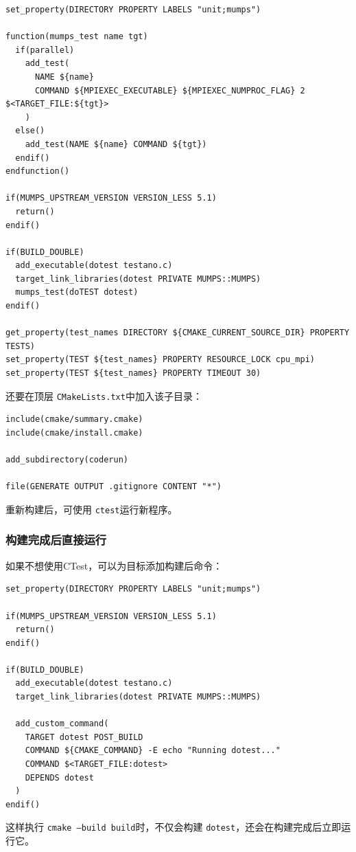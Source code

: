 \begin{lstlisting}
set_property(DIRECTORY PROPERTY LABELS "unit;mumps")

function(mumps_test name tgt)
  if(parallel)
    add_test(
      NAME ${name}
      COMMAND ${MPIEXEC_EXECUTABLE} ${MPIEXEC_NUMPROC_FLAG} 2 $<TARGET_FILE:${tgt}>
    )
  else()
    add_test(NAME ${name} COMMAND ${tgt})
  endif()
endfunction()

if(MUMPS_UPSTREAM_VERSION VERSION_LESS 5.1)
  return()
endif()

if(BUILD_DOUBLE)
  add_executable(dotest testano.c)
  target_link_libraries(dotest PRIVATE MUMPS::MUMPS)
  mumps_test(doTEST dotest)
endif()

get_property(test_names DIRECTORY ${CMAKE_CURRENT_SOURCE_DIR} PROPERTY TESTS)
set_property(TEST ${test_names} PROPERTY RESOURCE_LOCK cpu_mpi)
set_property(TEST ${test_names} PROPERTY TIMEOUT 30)
\end{lstlisting}

还要在顶层 \texttt{CMakeLists.txt}中加入该子目录：

\begin{lstlisting}
include(cmake/summary.cmake)
include(cmake/install.cmake)

add_subdirectory(coderun)

file(GENERATE OUTPUT .gitignore CONTENT "*")
\end{lstlisting}

重新构建后，可使用 \texttt{ctest}运行新程序。

\subsubsection{构建完成后直接运行}

如果不想使用CTest，可以为目标添加构建后命令：

\begin{lstlisting}
set_property(DIRECTORY PROPERTY LABELS "unit;mumps")

if(MUMPS_UPSTREAM_VERSION VERSION_LESS 5.1)
  return()
endif()

if(BUILD_DOUBLE)
  add_executable(dotest testano.c)
  target_link_libraries(dotest PRIVATE MUMPS::MUMPS)

  add_custom_command(
    TARGET dotest POST_BUILD
    COMMAND ${CMAKE_COMMAND} -E echo "Running dotest..."
    COMMAND $<TARGET_FILE:dotest>
    DEPENDS dotest
  )
endif()
\end{lstlisting}

这样执行 \texttt{cmake --build build}时，不仅会构建 \texttt{dotest}，还会在构建完成后立即运行它。

